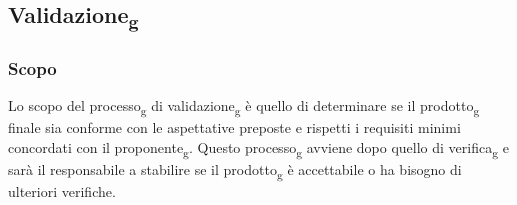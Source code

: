 \subsection{Validazione\textsubscript{g}}
\subsubsection{Scopo} 
Lo scopo del processo\textsubscript{g} di validazione\textsubscript{g} è quello di determinare se il prodotto\textsubscript{g} finale sia 
conforme con le aspettative preposte e rispetti i requisiti minimi concordati con il 
proponente\textsubscript{g}. Questo processo\textsubscript{g} avviene dopo quello di verifica\textsubscript{g} e sarà il responsabile a 
stabilire se il prodotto\textsubscript{g} è accettabile o ha bisogno di ulteriori verifiche.